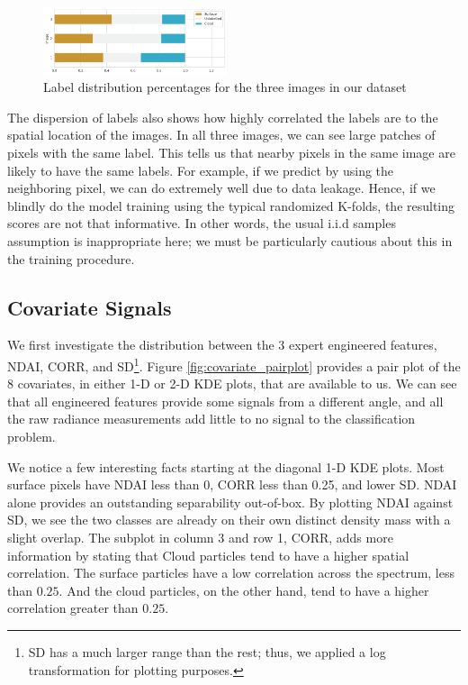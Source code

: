\documentclass[11pt, letterpaper, journal]{IEEEtran}
\begin{document}
\begin{figure}[!h]
\centering
\includegraphics[width=0.48\textwidth]{2.a.png}
\caption{Label distribution percentages for the three images in our dataset}
\label{fig:label_dist}
\end{figure}

The dispersion of labels also shows how highly correlated the labels are to the spatial location of the images. In all three images, we can see large patches of pixels with the same label. This tells us that nearby pixels in the same image are likely to have the same labels. For example, if we predict by using the neighboring pixel, we can do extremely well due to data leakage. Hence, if we blindly do the model training using the typical randomized K-folds, the resulting scores are not that informative. In other words, the usual i.i.d samples assumption is inappropriate here; we must be particularly cautious about this in the training procedure.


\subsection{Covariate Signals}
We first investigate the distribution between the 3 expert engineered features, NDAI, CORR, and SD\footnote{SD has a much larger range than the rest; thus, we applied a log transformation for plotting purposes.}. Figure \ref{fig:covariate_pairplot} provides a pair plot of the 8 covariates, in either 1-D or 2-D KDE plots, that are available to us. We can see that all engineered features provide some signals from a different angle, and all the raw radiance measurements add little to no signal to the classification problem.

We notice a few interesting facts starting at the diagonal 1-D KDE plots. Most surface pixels have NDAI less than 0, CORR less than 0.25, and lower SD. NDAI alone provides an outstanding separability out-of-box. By plotting NDAI against SD, we see the two classes are already on their own distinct density mass with a slight overlap. The subplot in column 3 and row 1, CORR, adds more information by stating that Cloud particles tend to have a higher spatial correlation. The surface particles have a low correlation across the spectrum, less than $0.25$. And the cloud particles, on the other hand, tend to have a higher correlation greater than $0.25$.
\end{document}
